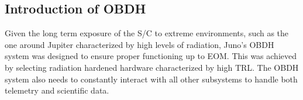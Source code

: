 \subsection{Introduction of OBDH}
\label{subsec:OBDH_inroduction}

Given the long term exposure of the S/C to extreme environments, such as the one around Jupiter characterized by high levels of radiation, Juno's OBDH system was designed to ensure proper functioning up to EOM. This was achieved by selecting radiation hardened hardware characterized by high TRL. The OBDH system also needs to constantly interact with all other subsystems to handle both telemetry and scientific data.